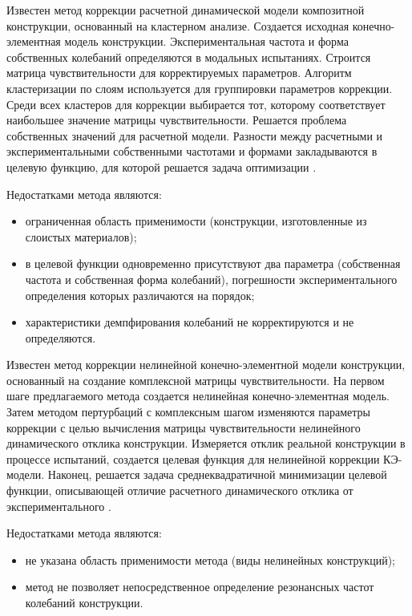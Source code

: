 Известен метод коррекции расчетной динамической модели композитной конструкции, основанный на кластерном анализе. Создается исходная конечно-элементная модель конструкции. Экспериментальная частота и форма собственных колебаний определяются в модальных испытаниях. Строится матрица чувствительности для корректируемых параметров. Алгоритм кластеризации по слоям используется для группировки параметров коррекции. Среди всех кластеров для коррекции выбирается тот, которому соответствует наибольшее значение матрицы чувствительности. Решается проблема собственных значений для расчетной модели. Разности между расчетными и экспериментальными собственными частотами и формами закладываются в целевую функцию, для которой решается задача оптимизации \cite{lib:modelUpdating:CN107357992A}.

Недостатками метода являются: 
\begin{itemize}
	\item ограниченная область применимости (конструкции, изготовленные из слоистых материалов); 
	\item в целевой функции одновременно присутствуют два параметра (собственная частота и собственная форма колебаний), погрешности экспериментального определения которых различаются на порядок; 
	\item характеристики демпфирования колебаний не корректируются и не определяются. 
\end{itemize}

Известен метод коррекции нелинейной конечно-элементной модели конструкции, основанный на создание комплексной матрицы чувствительности. На первом шаге предлагаемого метода создается нелинейная конечно-элементная модель. Затем методом пертурбаций с комплексным шагом изменяются параметры коррекции с целью вычисления матрицы чувствительности нелинейного динамического отклика конструкции. Измеряется отклик реальной конструкции в процессе испытаний, создается целевая функция для нелинейной коррекции КЭ-модели. Наконец, решается задача среднеквадратичной минимизации целевой функции, описывающей отличие расчетного динамического отклика от экспериментального \cite{lib:modelUpdating:CN109885896A}. 

Недостатками метода являются: 
\begin{itemize}
	\item не указана область применимости метода (виды нелинейных конструкций); 
	\item метод не позволяет непосредственное определение резонансных частот колебаний конструкции. 
\end{itemize}

